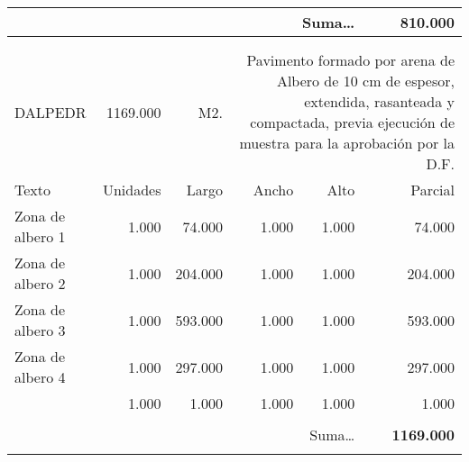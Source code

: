 \documentclass{book}%
\begin{document}
\begin{longtable}{lrrrrr}
\multicolumn{5}{r}{Suma\ldots}&\textbf{810.000}\\%
\hline%
&&&&&\\%
&&&&&\\%
DALPEDR&1169.000& M2.&\multicolumn{3}{p{6cm}}{\scriptsize Pavimento formado por arena de Albero de 10 cm de espesor, extendida, rasanteada y compactada, previa ejecución de muestra para la aprobación por la D.F.\normalsize}\\%
Texto&Unidades&Largo&Ancho&Alto&Parcial\\%
\hline%
\multicolumn{1}{p{3.5cm}}{Zona de albero 1}&1.000&74.000&1.000&1.000&74.000\\%
\multicolumn{1}{p{3.5cm}}{Zona de albero 2}&1.000&204.000&1.000&1.000&204.000\\%
\multicolumn{1}{p{3.5cm}}{Zona de albero 3}&1.000&593.000&1.000&1.000&593.000\\%
\multicolumn{1}{p{3.5cm}}{Zona de albero 4}&1.000&297.000&1.000&1.000&297.000\\%
\multicolumn{1}{p{3.5cm}}{}&1.000&1.000&1.000&1.000&1.000\\%
&&&&&\\%
\multicolumn{5}{r}{Suma\ldots}&\textbf{1169.000}\\%
\hline%
&&&&&\\%
\end{longtable}%
\newpage

%
\end{document}
